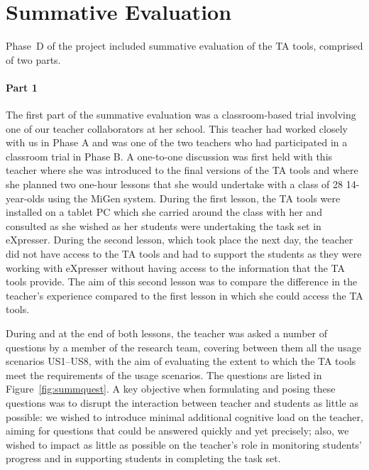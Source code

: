 
\section{Summative Evaluation}
\label{sec:summative-evaluation}

Phase~D of the project
included summative evaluation of the TA tools,
comprised of two parts. 

\paragraph{Part 1}
\label{sec:part-1}

The first part of the summative evaluation was a
classroom-based trial involving one of our teacher collaborators at
her school. This teacher had worked closely with us in Phase A and
was one of the two teachers who had participated in a classroom
trial in Phase B. A one-to-one discussion was first held with this
teacher where she was introduced to the final versions of the TA
tools and where she planned two one-hour lessons that she would
undertake with a class of 28 14-year-olds using the MiGen system.
During the first lesson, the TA tools were installed on a tablet PC
which she carried around the class with her and consulted as she
wished as her students were undertaking the task set in
eXpresser. During the second lesson, which took place the next day,
the teacher did not have access to the TA tools and had to support the
students as they were working with eXpresser without having access to
the information that the TA tools provide. The
aim of this second lesson was to compare the difference in the
teacher's experience compared to the first lesson in which she could
access the TA tools.

During and at the end of both lessons, the teacher was
asked a number of questions by a member of the research team, 
covering between them all the usage scenarios US1--US8, 
with the aim of evaluating the extent to which the TA tools 
meet the requirements of the usage scenarios. 
The questions are listed in Figure~\ref{fig:summquest}. 
A key objective when formulating and posing these questions 
was to disrupt the interaction between teacher and students as little as possible: 
we wished to introduce minimal additional cognitive load 
on the teacher, aiming for questions that could be answered quickly
and yet precisely; 
also, we wished to impact as little as possible on the teacher's role
in monitoring students' progress and in supporting students in
completing the task set. 

